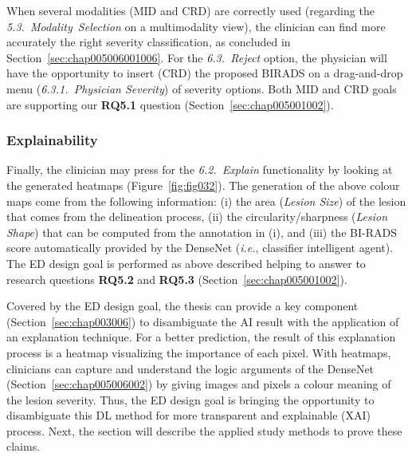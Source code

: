 When several modalities (\ac{MID} and \ac{CRD}) are correctly used (regarding the {\it 5.3.~Modality~Selection} on a multimodality view), the clinician can find more accurately the right severity classification, as concluded in Section~\ref{sec:chap005006001006}.
For the {\it 6.3.~Reject} option, the physician will have the opportunity to insert (\ac{CRD}) the proposed BIRADS on a drag-and-drop menu ({\it 6.3.1.~Physician Severity}) of severity options. Both \ac{MID} and \ac{CRD} goals are supporting our {\bf RQ5.1} question (Section~\ref{sec:chap005001002}).

\subsubsection{Explainability}
\label{sec:chap005004002002}

Finally, the clinician may press for the {\it 6.2.~Explain} functionality  by looking at the generated heatmaps (Figure~\ref{fig:fig032}).
The generation of the above colour maps come from the following information: (i) the area ({\it Lesion Size}) of the lesion that comes from the delineation process, (ii) the circularity/sharpness ({\it Lesion Shape}) that can be computed from the annotation in (i), and (iii) the BI-RADS score automatically provided by the DenseNet ({\it i.e.}, classifier intelligent agent).
The \ac{ED} design goal is performed as above described helping to answer to research questions {\bf RQ5.2} and {\bf RQ5.3} (Section~\ref{sec:chap005001002}).

Covered by the \ac{ED} design goal, the thesis can provide a key component (Section~\ref{sec:chap003006}) to disambiguate the \ac{AI} result with the application of an explanation technique.
For a better prediction, the result of this explanation process is a heatmap visualizing the importance of each pixel.
With heatmaps, clinicians can capture and understand the logic arguments of the DenseNet (Section~\ref{sec:chap005006002}) by giving images and pixels a colour meaning of the lesion severity.
Thus, the \ac{ED} design goal is bringing the opportunity to disambiguate this \ac{DL} method for more transparent and explainable (\ac{XAI}) process.
Next, the section will describe the applied study methods to prove these claims.


